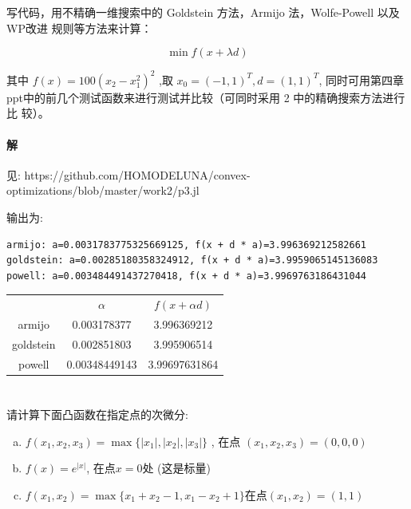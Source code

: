 \documentclass[a4paper]{article}
\begin{document}
\section{}
写代码，用不精确一维搜索中的 Goldstein 方法，Armijo 法，Wolfe-Powell 以及WP改进
规则等方法来计算：

\[ \min f(x + \lambda d)\]

其中 \(f(x)=100(x_2 - x_1^2)^2 \) ,取 \(x_0 = (-1,1)^T, d = (1,1)^T\), 同时可用第四章
ppt中的前几个测试函数来进行测试并比较（可同时采用 2 中的精确搜索方法进行比
较）。

\paragraph{解}

见: https://github.com/HOMODELUNA/convex-optimizations/blob/master/work2/p3.jl

输出为:
\begin{lstlisting}
armijo: a=0.0031783775325669125, f(x + d * a)=3.996369212582661
goldstein: a=0.00285180358324912, f(x + d * a)=3.9959065145136083
powell: a=0.003484491437270418, f(x + d * a)=3.9969763186431044
\end{lstlisting}

\begin{table}[H]
    \centering
    \begin{tabular}{ccc}
                &$\alpha$ & $f(x + \alpha d)$ \\
         armijo & 0.003178377 & 3.996369212 \\
         goldstein & 0.002851803 & 3.995906514 \\
         powell & 0.00348449143 & 3.99697631864
    \end{tabular}
\end{table}

\section{}

请计算下面凸函数在指定点的次微分:
\begin{enumerate}[(a)]
    \item \(f(x_1,x_2,x_3) = \max\{|x_1|,|x_2|,|x_3|\}\) , 在点 \((x_1,x_2,x_3) = (0,0,0)\)
    \item \(f(x) = e^{|x|}\), 在点\(x=0\)处 (这是标量)
    \item \(f(x_1,x_2) = \max\{x_1+x_2-1,x_1-x_2+1\}\)在点\((x_1,x_2) = (1,1)\) 
\end{enumerate}
\end{document}

